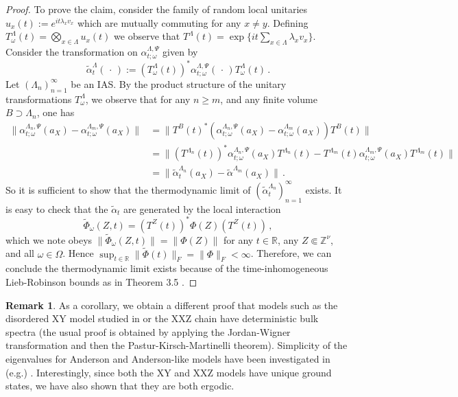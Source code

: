 \documentclass{article}
\newcommand{\Znu}{\mathbb{Z}^\nu}
\newcommand{\R}{\mathbb R}
\newcommand{\<}{\langle}
\renewcommand{\>}{\rangle}
\theoremstyle{definition}
\newtheorem{rmk}[thm]{Remark}
\numberwithin{equation}{section}
\begin{document}
\begin{proof}
    
    To prove the claim, consider the family of random local unitaries  $u_x(t) := e^{it\lambda_x v_x}$ which are mutually commuting for any $x\neq y$. Defining $T^{\Lambda}_\omega(t) = \bigotimes_{x\in \Lambda} u_x(t)$ we observe that $T^{\Lambda}(t) = \exp\{it\sum_{x\in \Lambda} \lambda_x v_x\}$. Consider the transformation on $\alpha^{\Lambda,\Psi}_{t;\omega}$ given by 
    \[
        \tilde \alpha_t^{\Lambda}(\, \cdot\,) := (T^{\Lambda}_\omega (t))^*\alpha^{\Lambda, \Psi}_{t;\omega}(\, \cdot\,)T^{\Lambda}_\omega(t)\,.
    \] Let $(\Lambda_n)_{n=1}^\infty$ be an IAS. By the product structure of the unitary transformations $T^{\Lambda}_\omega$, we observe that for any $n\ge m$, and any finite volume $B\supset \Lambda_n$, one has 
    \begin{align*}
        \|\alpha^{\Lambda_n, \Psi}_{t;\omega}(a_X) - \alpha^{\Lambda_m, \Psi}_{t;\omega}(a_X)\| &=\|T^B(t)^*( \alpha^{\Lambda_n, \Psi}_{t;\omega}(a_X) - \alpha^{\Lambda_m}_{t;\omega}(a_X))T^B(t)\|\\
        &= \|(T^{\Lambda_n}(t))^* \alpha^{\Lambda_n, \Psi}_{t;\omega}(a_X)T^{\Lambda_n} (t) - T^{\Lambda_m}(t) \alpha^{\Lambda_m, \Psi}_{t;\omega}(a_X) T^{\Lambda_m}(t)\|\\
        &= \|\tilde \alpha^{\Lambda_n}_t (a_X) - \tilde \alpha^{\Lambda_m}(a_X)\|\,.
    \end{align*} So it is sufficient to show that the thermodynamic limit of $(\tilde \alpha^{\Lambda_n}_t)_{n=1}^\infty$ exists. It is easy to check that the $\tilde \alpha_t$ are generated by the local interaction 
        \[
            \tilde \Phi_\omega(Z,t) = (T^{Z}(t))^*\Phi(Z)( T^{Z}(t))\,,
        \] which we note obeys $\|\tilde \Phi_\omega(Z,t)\| = \|\Phi(Z)\|$ for any $t\in \R$, any $Z\Subset \Znu$, and all $\omega\in \Omega$. Hence $\sup_{t\in \R} \|\tilde \Phi(t)\|_F = \|\Phi\|_F<\infty$. Therefore, we can conclude the thermodynamic limit exists because of the time-inhomogeneous Lieb-Robinson bounds as in Theorem 3.5 \cite{NachtergaeleSimsYoung}. 
\end{proof}

   \begin{rmk}
    As a corollary, we obtain a different proof that models such as the disordered XY model studied in \cite{HamzaSimsStolz} or the XXZ chain \cite{Stolz_MBL} have deterministic bulk spectra (the usual proof is obtained by applying the Jordan-Wigner transformation and then the Pastur-Kirsch-Martinelli theorem). Simplicity of the eigenvalues for Anderson and Anderson-like models have been investigated in (e.g.) \cite{KleinMolchanov, NabokoNicholsStolz}. Interestingly, since both the XY and XXZ models have unique ground states, we have also shown that they are both ergodic. 
\end{rmk}
 
\end{document}

